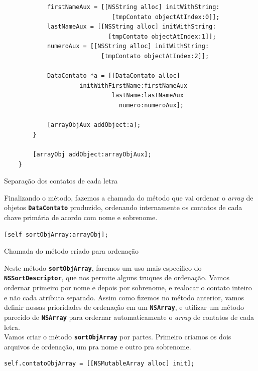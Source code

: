 \documentclass[a4paper,12pt,brazil,doubleside]{book}
\begin{document}
\begin{singlespace}
\begin{listing}[H]
\begin{verbatim}
            firstNameAux = [[NSString alloc] initWithString:
                              [tmpContato objectAtIndex:0]];
            lastNameAux = [[NSString alloc] initWithString:
                             [tmpContato objectAtIndex:1]];
            numeroAux = [[NSString alloc] initWithString:
                           [tmpContato objectAtIndex:2]];
            
            DataContato *a = [[DataContato alloc] 
                     initWithFirstName:firstNameAux
                              lastName:lastNameAux
                                numero:numeroAux];
            
            [arrayObjAux addObject:a];            
        }
        
        [arrayObj addObject:arrayObjAux];
    }
\end{verbatim}
\caption{Separação dos contatos de cada letra}
\end{listing}


Finalizando o método, fazemos a chamada do método que vai ordenar o \emph{array} de objetos \texttt{\textbf{DataContato}} produzido, ordenando internamente os contatos de cada chave primária de acordo com nome e sobrenome.

\begin{listing}[H]
\begin{verbatim}
[self sortObjArray:arrayObj];
\end{verbatim}
\caption{Chamada do método criado para ordenação}
\end{listing}


Neste método \texttt{\textbf{sortObjArray}}, faremos um uso mais específico do \texttt{\textbf{NSSortDescriptor}}, que nos permite alguns truques de ordenação. Vamos ordernar primeiro por nome e depois por sobrenome, e realocar o contato inteiro e não cada atributo separado. Assim como fizemos no método anterior, vamos definir nossas prioridades de ordenação em um \texttt{\textbf{NSArray}}, e utilizar um método parecido de \texttt{\textbf{NSArray}} para ordernar automaticamente o \emph{array} de contatos de cada letra.\\

Vamos criar o método \texttt{\textbf{sortObjArray}} por partes. Primeiro criamos os dois arquivos de ordenação, um pra nome e outro pra sobrenome.

\begin{listing}[H]
\begin{verbatim}
self.contatoObjArray = [[NSMutableArray alloc] init];
    

\end{verbatim}
\end{listing}
\end{singlespace}
\end{document}
